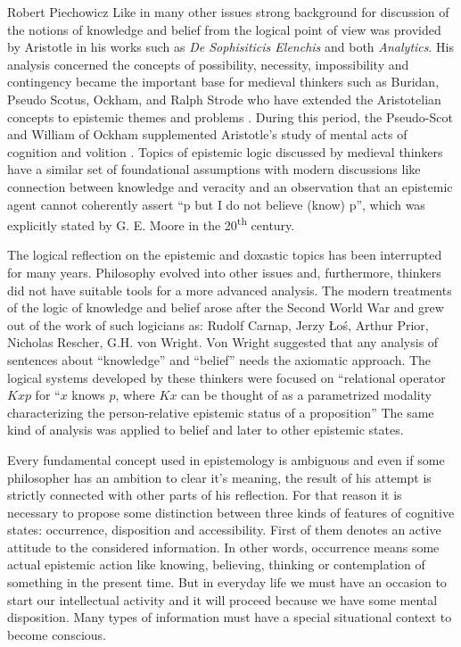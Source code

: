 \begin{artengenv}{Robert Piechowicz}
\indent Like in many other issues strong background for discussion of the notions of knowledge and belief from the logical point of view was provided by Aristotle in his works such as \textit{De Sophisiticis Elenchis} and both \textit{Analytics}. His analysis concerned the concepts of possibility, necessity, impossibility and contingency  became the important base for medieval thinkers such as Buridan, Pseudo Scotus, Ockham, and Ralph Strode who have extended the Aristotelian concepts to epistemic themes and problems \parencites[see][]{boh_epistemic_1993}{knuuttila_modalities_1993}.
During this period, the Pseudo-Scot and William of Ockham supplemented Aristotle’s study of mental acts of cognition and volition
\parencite[see][p.130]{boh_epistemic_1993}.
Topics of epistemic logic discussed by medieval thinkers have a similar set of foundational assumptions with modern discussions like connection between knowledge and veracity and an observation that an epistemic agent cannot coherently assert ``p but I do not believe (know) p'', which was explicitly stated  by G. E. Moore in the 20\textsuperscript{th} century.

The logical reflection on the epistemic and doxastic topics has been interrupted for many years. Philosophy evolved into other issues and, furthermore, thinkers did not have suitable tools for a more advanced analysis. The modern treatments of the logic of knowledge and belief arose after the Second World War and grew out of the work of such logicians as: Rudolf Carnap, Jerzy \L{}o\'{s}, Arthur Prior, Nicholas Rescher, G.H. von Wright. Von Wright suggested that any analysis of sentences about ``knowledge'' and ``belief'' needs the axiomatic approach. The logical systems developed by these thinkers were focused on ``relational operator $Kxp$ for ``$x$ knows $p$, where $Kx$ can be thought of as a parametrized modality characterizing  the person-relative epistemic status of a proposition''
\parencite[][p.478]{jacquette_epistemic_2002}
The same kind of analysis was applied to belief and later to other epistemic states.

	Every fundamental concept used in epistemology is ambiguous and even if some philosopher has an ambition to clear it’s meaning, the result of his attempt is strictly connected with other parts of his reflection. For that reason it is necessary to propose some distinction between three kinds of features of cognitive states: occurrence, disposition and accessibility. First of them denotes an active attitude to the considered information. In other words, occurrence means some actual epistemic action like knowing, believing, thinking or contemplation of something in the present time. But in everyday life we must have an occasion to start our intellectual activity and it will proceed because we have some mental disposition. Many types of information must have a special situational context to become conscious. 


\end{artengenv}

